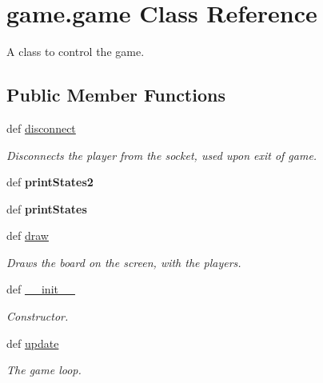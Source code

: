 \hypertarget{classgame_1_1game}{
\section{game.game Class Reference}
\label{classgame_1_1game}
}


A class to control the game.  


\subsection*{Public Member Functions}
\begin{DoxyCompactItemize}
\item 
\hypertarget{classgame_1_1game_acc2ad17f76c5b73de5989139a893f447}{
def \hyperlink{classgame_1_1game_acc2ad17f76c5b73de5989139a893f447}{disconnect}}
\label{classgame_1_1game_acc2ad17f76c5b73de5989139a893f447}

\begin{DoxyCompactList}\small\item\em Disconnects the player from the socket, used upon exit of game. \item\end{DoxyCompactList}\item 
\hypertarget{classgame_1_1game_a11bfd0ed224b4c55ab1cfb932bdfa659}{
def {\bfseries printStates2}}
\label{classgame_1_1game_a11bfd0ed224b4c55ab1cfb932bdfa659}

\item 
\hypertarget{classgame_1_1game_a1b57dfb04fb483ed414e2b542f5a11bf}{
def {\bfseries printStates}}
\label{classgame_1_1game_a1b57dfb04fb483ed414e2b542f5a11bf}

\item 
\hypertarget{classgame_1_1game_ae5dfdd0e798d92d1085c13a040afaa04}{
def \hyperlink{classgame_1_1game_ae5dfdd0e798d92d1085c13a040afaa04}{draw}}
\label{classgame_1_1game_ae5dfdd0e798d92d1085c13a040afaa04}

\begin{DoxyCompactList}\small\item\em Draws the board on the screen, with the players. \item\end{DoxyCompactList}\item 
def \hyperlink{classgame_1_1game_ab012f4d82441309ba1c14872d3ca646d}{\_\-\_\-init\_\-\_\-}
\begin{DoxyCompactList}\small\item\em Constructor. \item\end{DoxyCompactList}\item 
\hypertarget{classgame_1_1game_aaae434193f036a605907d2738631ef23}{
def \hyperlink{classgame_1_1game_aaae434193f036a605907d2738631ef23}{update}}
\label{classgame_1_1game_aaae434193f036a605907d2738631ef23}

\begin{DoxyCompactList}\small\item\em The game loop. \item\end{DoxyCompactList}\end{DoxyCompactItemize}


